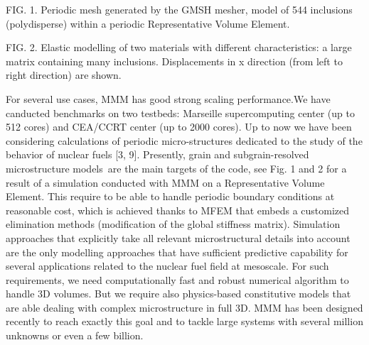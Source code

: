 FIG. 1. Periodic mesh generated by the GMSH mesher, model of 544 inclusions (polydisperse) within a periodic Representative Volume Element.

FIG. 2. Elastic modelling of two materials with different characteristics: a large matrix containing many inclusions. Displacements in x direction (from left to right direction) are shown.

For several use cases, MMM has good strong scaling performance.We have canducted benchmarks on two testbeds: Marseille supercomputing center (up to 512 cores) and CEA/CCRT center (up to 2000 cores). Up to now we have been considering calculations of periodic micro-structures dedicated to the study of the behavior of nuclear fuels [3, 9]. Presently, grain and subgrain-resolved microstructure models are the main targets of the code, see Fig. 1 and 2 for a result of a simulation conducted with MMM on a Representative Volume Element. This require to be able to handle periodic boundary conditions at reasonable cost, which is achieved thanks to MFEM that embeds a customized elimination methods (modification of the global stiffness matrix). Simulation approaches that explicitly take all relevant microstructural details into account are the only modelling approaches that have sufficient predictive capability for several applications related to the nuclear fuel field at mesoscale. For such requirements, we need computationally fast and robust numerical algorithm to handle 3D volumes. But we require also physics-based constitutive models that are able dealing with complex microstructure in full 3D. MMM has been designed recently to reach exactly this goal and to tackle large systems with several million unknowns or even a few billion.

